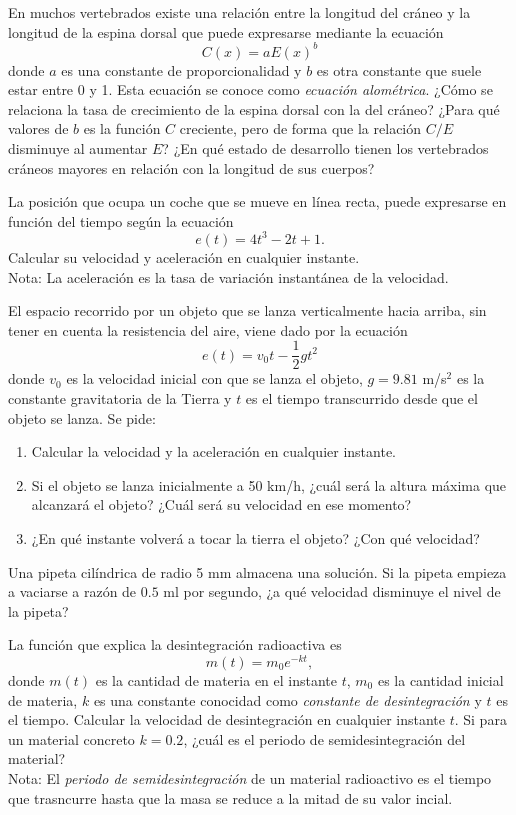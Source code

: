 {En muchos vertebrados existe una relación entre la longitud del cráneo y la longitud de la espina dorsal que puede expresarse mediante la ecuación
\[
C(x) = a E(x)^b
\] 
donde $a$ es una constante de proporcionalidad y $b$ es otra constante que suele estar entre 0 y 1. 
Esta ecuación se conoce como \emph{ecuación alométrica}.
¿Cómo se relaciona la tasa de crecimiento de la espina dorsal con la del cráneo? 
¿Para qué valores de $b$ es la función $C$ creciente, pero de forma que la relación $C/E$ disminuye al aumentar $E$?
¿En qué estado de desarrollo tienen los vertebrados cráneos mayores en relación con la longitud de sus cuerpos? 
}
{
}
{
}


{La posición que ocupa un coche que se mueve en línea recta, puede expresarse en función del tiempo según la ecuación
\[
e(t) = 4t^3 -2t +1.
\]
Calcular su velocidad y aceleración en cualquier instante.\\
Nota: La aceleración es la tasa de variación instantánea de la velocidad.  
}
{
}
{
}


{El espacio recorrido por un objeto que se lanza verticalmente hacia arriba, sin tener en cuenta la resistencia del aire, viene dado por la ecuación 
\[
e(t) =v_0t-\frac{1}{2}gt^2
\]
donde $v_0$ es la velocidad inicial con que se lanza el objeto, $g=9.81$ m/s$^2$ es la constante gravitatoria de la Tierra y $t$ es el tiempo transcurrido desde que el objeto se lanza. 
Se pide:
\begin{enumerate} 
\item Calcular la velocidad y la aceleración en cualquier instante. 
\item Si el objeto se lanza inicialmente a 50 km/h, ¿cuál será la altura máxima que alcanzará el objeto? ¿Cuál será su velocidad en ese momento?
\item ¿En qué instante volverá a tocar la tierra el objeto? ¿Con qué velocidad?
\end{enumerate} 
}
{
}
{
}


{Una pipeta cilíndrica de radio 5 mm almacena una solución. 
Si la pipeta empieza a vaciarse a razón de $0.5$ ml por segundo, ¿a qué velocidad disminuye el nivel de la pipeta?   
}
{
}
{
}


{La función que explica la desintegración radioactiva es
\[
m(t) = m_0e^{-kt},
\]
donde $m(t)$ es la cantidad de materia en el instante $t$, $m_0$ es la cantidad inicial de materia, $k$ es una constante conocidad como \emph{constante de desintegración} y $t$ es el tiempo.
Calcular la velocidad de desintegración en cualquier instante $t$. Si para un material concreto $k=0.2$, ¿cuál es el periodo de semidesintegración del material?\\
Nota: El \emph{periodo de semidesintegración} de un material radioactivo es el tiempo que trasncurre hasta que la masa se reduce a la mitad de su valor incial.
}
{
}
{
}


